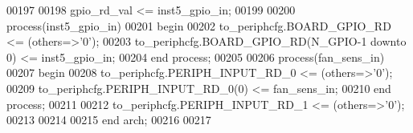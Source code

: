 \begin{DoxyCode}
00197                      
00198    \textcolor{vhdlchar}{gpio_rd_val}    \textcolor{vhdlchar}{<=} \textcolor{vhdlchar}{inst5_gpio_in};
00199    
00200    \textcolor{keywordflow}{process}(inst5_gpio_in)
00201 \textcolor{vhdlkeyword}{   begin }
00202       \textcolor{vhdlchar}{to_periphcfg}\textcolor{vhdlchar}{.}\textcolor{vhdlchar}{BOARD_GPIO_RD} \textcolor{vhdlchar}{<=} \textcolor{vhdlchar}{(}\textcolor{keywordflow}{others}\textcolor{vhdlchar}{=}\textcolor{vhdlchar}{>}\textcolor{vhdlchar}{'}\textcolor{vhdllogic}{}\textcolor{vhdllogic}{0}\textcolor{vhdlchar}{'}\textcolor{vhdlchar}{)};
00203       \textcolor{vhdlchar}{to_periphcfg}\textcolor{vhdlchar}{.}\textcolor{vhdlchar}{BOARD_GPIO_RD}\textcolor{vhdlchar}{(}\textcolor{vhdlchar}{N_GPIO}\textcolor{vhdlchar}{-}\textcolor{vhdllogic}{}\textcolor{vhdllogic}{1} \textcolor{keywordflow}{downto} \textcolor{vhdllogic}{}\textcolor{vhdllogic}{0}\textcolor{vhdlchar}{)} \textcolor{vhdlchar}{<=} \textcolor{vhdlchar}{inst5_gpio_in};
00204    \textcolor{keywordflow}{end} \textcolor{keywordflow}{process};
00205    
00206    \textcolor{keywordflow}{process}(fan_sens_in)
00207 \textcolor{vhdlkeyword}{   begin }
00208       \textcolor{vhdlchar}{to_periphcfg}\textcolor{vhdlchar}{.}\textcolor{vhdlchar}{PERIPH_INPUT_RD_0} \textcolor{vhdlchar}{<=} \textcolor{vhdlchar}{(}\textcolor{keywordflow}{others}\textcolor{vhdlchar}{=}\textcolor{vhdlchar}{>}\textcolor{vhdlchar}{'}\textcolor{vhdllogic}{}\textcolor{vhdllogic}{0}\textcolor{vhdlchar}{'}\textcolor{vhdlchar}{)};
00209       \textcolor{vhdlchar}{to_periphcfg}\textcolor{vhdlchar}{.}\textcolor{vhdlchar}{PERIPH_INPUT_RD_0}\textcolor{vhdlchar}{(}\textcolor{vhdllogic}{}\textcolor{vhdllogic}{0}\textcolor{vhdlchar}{)} \textcolor{vhdlchar}{<=} \textcolor{vhdlchar}{fan_sens_in};
00210    \textcolor{keywordflow}{end} \textcolor{keywordflow}{process};
00211    
00212    \textcolor{vhdlchar}{to_periphcfg}\textcolor{vhdlchar}{.}\textcolor{vhdlchar}{PERIPH_INPUT_RD_1} \textcolor{vhdlchar}{<=} \textcolor{vhdlchar}{(}\textcolor{keywordflow}{others}\textcolor{vhdlchar}{=}\textcolor{vhdlchar}{>}\textcolor{vhdlchar}{'}\textcolor{vhdllogic}{}\textcolor{vhdllogic}{0}\textcolor{vhdlchar}{'}\textcolor{vhdlchar}{)};
00213                      
00214       
00215 \textcolor{keywordflow}{end} \textcolor{vhdlchar}{arch};   
00216 
00217 
\end{DoxyCode}
